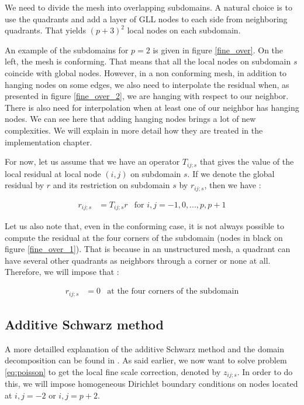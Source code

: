 We need to divide the mesh into overlapping subdomains. A natural choice is to use the quadrants and add a layer of GLL nodes to each side from neighboring quadrants. That yields $(p+3)^2$ local nodes on each subdomain. 

An example of the subdomains for $p=2$ is given in figure \ref{fine_over}. On the left, the mesh is conforming. That means that all the local nodes on subdomain $s$ coincide with global nodes. However, in a non conforming mesh, in addition to hanging nodes on some edges, we also need to interpolate the residual when, as presented in figure \ref{fine_over_2}, we are hanging with respect to our neighbor. There is also need for interpolation when at least one of our neighbor has hanging nodes. We can see here that adding hanging nodes brings a lot of new complexities. We will explain in more detail how they are treated in the implementation chapter. 

For now, let us assume that we have an operator $T_{ij;s}$ that gives the value of the local residual at local node $(i,j)$ on subdomain $s$. If we denote the global residual by $r$ and its restriction on subdomain $s$ by $r_{ij;s}$, then we have : 

\begin{align*}
r_{ij;s} &= T_{ij;s}r &\text{for $i,j=-1,0,...,p,p+1$} 
\end{align*}

Let us also note that, even in the conforming case, it is not always possible to compute the residual at the four corners of the subdomain (nodes in black on figure \ref{fine_over_1}). That is because in an unstructured mesh, a quadrant can have several other quadrants as neighbors through a corner or none at all. Therefore, we will impose that :

\begin{align*}
r_{ij;s} &= 0  &\text{at the four corners of the subdomain}
\end{align*} 

\subsection{Additive Schwarz method}

A more detailled explanation of the additive Schwarz method and the domain decomposition can be found in \cite{fine_book}. As said earlier, we now want to solve problem \ref{eq:poisson} to get the local fine scale correction, denoted by $z_{ij;s}$. In order to do this, we will impose homogeneous Dirichlet boundary conditions on nodes located at $i,j = -2$ or $i,j= p+2$.

